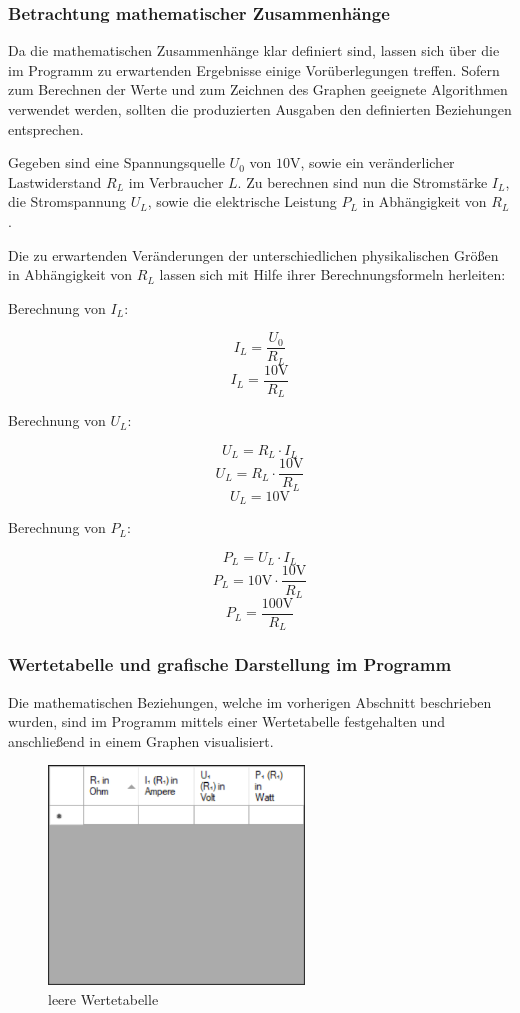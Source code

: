 \documentclass[a4paper]{article}
\begin{document}
    \subsubsection{Betrachtung mathematischer Zusammenhänge}

    Da die mathematischen Zusammenhänge klar definiert sind, lassen sich über die im Programm zu erwartenden Ergebnisse einige Vorüberlegungen treffen.
    Sofern zum Berechnen der Werte und zum Zeichnen des Graphen geeignete Algorithmen verwendet werden, sollten die produzierten Ausgaben den definierten Beziehungen entsprechen.

    Gegeben sind eine Spannungsquelle $U_0$ von $10 \si{\volt}$, sowie ein veränderlicher Lastwiderstand $R_L$ im Verbraucher $L$.
    Zu berechnen sind nun die Stromstärke $I_L$, die Stromspannung $U_L$, sowie die elektrische Leistung $P_L$ in Abhängigkeit von $R_L$.

    Die zu erwartenden Veränderungen der unterschiedlichen physikalischen Größen in Abhängigkeit von $R_L$ lassen sich mit Hilfe ihrer Berechnungsformeln herleiten:

    Berechnung von $I_L$:

    \[ I_L = \frac{U_0}{R_L} \]
    \[ I_L = \frac{10\si{\volt}}{R_L} \]

    Berechnung von $U_L$:

    \[ U_L = R_L \cdot I_L \]
    \[ U_L = R_L \cdot \frac{10\si{\volt}}{R_L} \]
    \[ U_L = 10\si{\volt} \]

    Berechnung von $P_L$:

    \[ P_L = U_L \cdot I_L \]
    \[ P_L = 10\si{\volt} \cdot \frac{10\si{\volt}}{R_L} \]
    \[ P_L = \frac{100\si{\volt}}{R_L} \]

    \subsubsection{Wertetabelle und grafische Darstellung im Programm}
    
    Die mathematischen Beziehungen, welche im vorherigen Abschnitt beschrieben wurden, sind im Programm mittels einer Wertetabelle festgehalten und anschließend in einem Graphen visualisiert.
    \begin{figure}[!h]
        \begin{center}
            \includegraphics[width=6.8cm]{img/tabelle}
            \caption{leere Wertetabelle}
            \label{fig:tabelle}
        \end{center}
    \end{figure}
\end{document}
